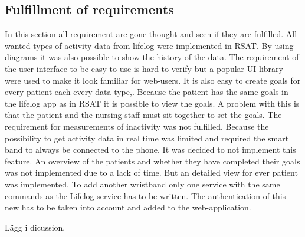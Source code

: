 \documentclass{cslthse-msc}
\begin{document}
\subsection{Fulfillment of requirements}

In this section all requirement are gone thought and seen if they are fulfilled. All wanted types of activity data from lifelog were implemented in RSAT. By using diagrams it was also possible to show the history of the data. The requirement of the user interface to be easy to use is hard to verify but a popular UI library were used to make it look familiar for web-users. It is also easy to create goals for every patient each every data type,. Because the patient has the same goals in the lifelog app as in RSAT it is possible to view the goals. A problem with this is that the patient and the nursing staff must sit together to set the goals. The requirement for measurements of inactivity was not fulfilled. Because the possibility to get activity data in real time was limited and required the smart band to always be connected to the phone. It was decided to not implement this feature.  An overview of the patients and whether they have completed their goals was not implemented due to a lack of time. But an detailed view for ever patient was implemented. To add another wristband only one service with the same commands as the Lifelog service has to be written. The authentication of this new has to be taken into account and added to the web-application. 






Lägg i dicussion. 


\end{document}
